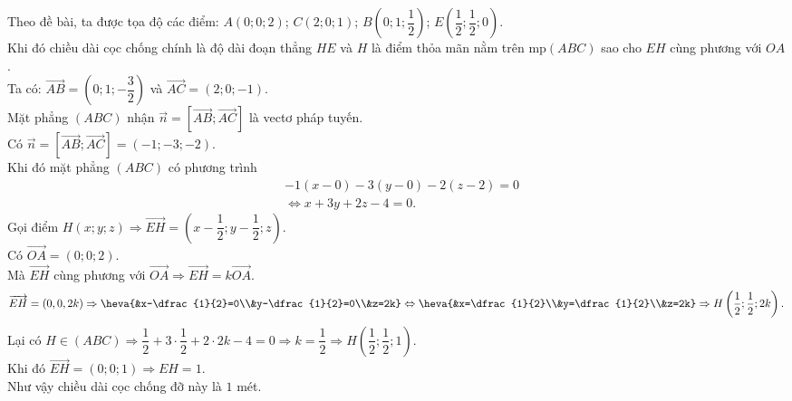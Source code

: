 \begin{bt}
{\begin{center}
		\end{center}
		Theo đề bài, ta được tọa độ các điểm: $A\left(  0;0;2\right) $; $C\left( 2;0;1\right) $; $B\left( 0;1;\dfrac{1}{2}\right) $; $E\left( \dfrac{1}{2};\dfrac{1}{2};0\right) $.\\
		Khi đó chiều dài cọc chống chính là độ dài đoạn thẳng $HE$ và $H$ là điểm thỏa mãn nằm trên mp$ (ABC)$ sao cho $EH$ cùng phương với $OA$.\\ 
		 Ta có: $\overrightarrow{AB}=\left( 0;1;-\dfrac{3}{2}\right)$ và $\overrightarrow{AC}=(2;0;-1)$.\\
		Mặt phẳng $(ABC)$ nhận  $\overrightarrow{n}=\left[\overrightarrow{AB}; \overrightarrow{AC}\right]$ là vectơ pháp tuyến.\\
		Có $\overrightarrow{n}=\left[\overrightarrow{AB}; \overrightarrow{AC}\right]=(-1;-3;-2)$.\\ 
		Khi đó mặt  phẳng $(ABC)$ có phương trình
		\begin{align*}
			&-1(x-0)-3(y-0)-2(z-2)=0\\ 
			&\Leftrightarrow x+3y+2z-4=0. 
		\end{align*}
		Gọi điểm $H  (x;y;z) \Rightarrow \overrightarrow{EH}=\left( x-\dfrac{1}{2};y-\dfrac{1}{2};z\right) $.\\
		Có $\overrightarrow{OA}=(0;0;2)$.\\ 
		Mà $\overrightarrow{EH}$  cùng phương với $\overrightarrow{OA} \Rightarrow \overrightarrow{EH}=k\overrightarrow{OA}$.
		\begin{align*}
			\overrightarrow{EH}=\left(0,0,2k \right) \Rightarrow  \heva{&x-\dfrac{1}{2}=0\\&y-\dfrac{1}{2}=0\\&z=2k}\Leftrightarrow\heva{&x=\dfrac{1}{2}\\&y=\dfrac{1}{2}\\&z=2k}\Rightarrow H\left(\dfrac{1}{2}; \dfrac{1}{2};2k \right).
		\end{align*}
		Lại có $H\in\left(ABC \right) \Rightarrow \dfrac{1}{2}+3\cdot \dfrac{1}{2}+2\cdot  2k-4=0 \Rightarrow k=\dfrac{1}{2}\Rightarrow H\left(\dfrac{1}{2}; \dfrac{1}{2};1 \right)$.\\
		Khi đó $\overrightarrow{EH}=  \left(0;0;1 \right) \Rightarrow EH=1 $.\\
		Như  vậy chiều dài cọc chống đỡ này là $1$ mét.
	 }
\end{bt}

